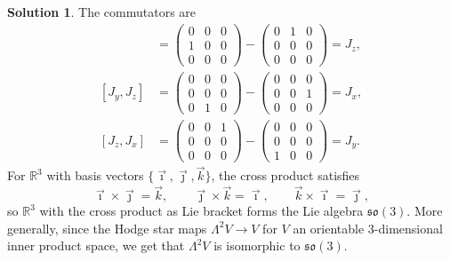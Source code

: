 \documentclass[11pt, a4paper]{report}
\theoremstyle{definition}
\newtheorem{solution}{Solution}[part]
\newenvironment{sol}{\begin{solution}}{\end{solution}\pagebreak[3]}
\begin{document}
\begin{sol}
The commutators are
\begin{align*}
    [J_x, J_y] &=
        \begin{pmatrix}
            0 & 0 & 0 \\
            1 & 0 & 0 \\
            0 & 0 & 0
        \end{pmatrix}
        - \begin{pmatrix}
            0 & 1 & 0 \\
            0 & 0 & 0 \\
            0 & 0 & 0
        \end{pmatrix}
        = J_z, \\
    [J_y, J_z] &=
        \begin{pmatrix}
            0 & 0 & 0 \\
            0 & 0 & 0 \\
            0 & 1 & 0
        \end{pmatrix}
        - \begin{pmatrix}
            0 & 0 & 0 \\
            0 & 0 & 1 \\
            0 & 0 & 0
        \end{pmatrix}
        = J_x, \\
    [J_z, J_x] &=
        \begin{pmatrix}
            0 & 0 & 1 \\
            0 & 0 & 0 \\
            0 & 0 & 0
        \end{pmatrix}
        - \begin{pmatrix}
            0 & 0 & 0 \\
            0 & 0 & 0 \\
            1 & 0 & 0
        \end{pmatrix}
        = J_y.
\end{align*}
For $\mathbb{R}^3$ with basis vectors $\{\vec{\imath}, \vec{\jmath}, \vec{k}\}$, the cross product satisfies
\[
    \vec{\imath} \times \vec{\jmath} = \vec{k}, \qquad
    \vec{\jmath} \times \vec{k} = \vec{\imath}, \qquad
    \vec{k} \times \vec{\imath} = \vec{\jmath},
\]
so $\mathbb{R}^3$ with the cross product as Lie bracket forms the Lie algebra $\mathfrak{so}(3)$.
More generally, since the Hodge star maps $\Lambda^2 V \to V$ for $V$ an orientable 3-dimensional inner product space, we get that $\Lambda^2 V$ is isomorphic to $\mathfrak{so}(3)$.

\end{sol}
\end{document}
